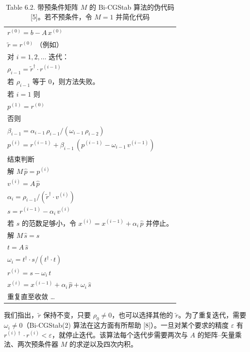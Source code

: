 \begin{table}[htbp]
  \centering
  \caption*{Table 6.2. 带预条件矩阵 $M$ 的 Bi-CGStab 算法的伪代码 [5]。若不预条件，令 $M = 1$ 并简化代码}
  \small
  \begin{tabular}{@{}l@{}}
    $r^{(0)} = b - A\, x^{(0)}$ \\
    $\tilde{r} = r^{(0)}$ \quad （例如） \\
    对 $i = 1, 2, \ldots$ 迭代： \\
    \quad $\rho_{i-1} = \tilde{r}^{\dagger} \cdot r^{(i-1)}$ \\
    \quad 若 $\rho_{i-1}$ 等于 0，则方法失败。 \\
    \quad 若 $i = 1$ 则 \\
    \quad\quad $p^{(1)} = r^{(0)}$ \\
    \quad 否则 \\
    \quad\quad $\beta_{i-1} = \alpha_{i-1}\, \rho_{i-1} / (\omega_{i-1}\,
      \rho_{i-2})$ \\
    \quad\quad $p^{(i)} = r^{(i-1)} + \beta_{i-1}\, (p^{(i-1)} - \omega_{i-1}\,
      v^{(i-1)})$ \\
    \quad 结束判断 \\
    \quad 解 $M\, \hat{p} = p^{(i)}$ \\
    \quad $v^{(i)} = A\, \hat{p}$ \\
    \quad $\alpha_i = \rho_{i-1} / (\tilde{r}^{\dagger} \cdot v^{(i)})$ \\
    \quad $s = r^{(i-1)} - \alpha_i\, v^{(i)}$ \\
    \quad 若 $s$ 的范数足够小，令 $x^{(i)} = x^{(i-1)} +
      \alpha_i\, \hat{p}$ 并停止。 \\
    \quad 解 $M\, \hat{s} = s$ \\
    \quad $t = A\, \hat{s}$ \\
    \quad $\omega_i = t^{\dagger} \cdot s / (t^{\dagger} \cdot t)$ \\
    \quad $r^{(i)} = s - \omega_i\, t$ \\
    \quad $x^{(i)} = x^{(i-1)} + \alpha_i\, \hat{p} + \omega_i\, \hat{s}$ \\
    重复直至收敛 \ldots
  \end{tabular}
\end{table}

我们指出，$\tilde{r}$ 保持不变，只要 $\rho_0 \neq 0$，也可以选择其他的 $\tilde{r}$。为了重复迭代，需要 $\omega_i \neq 0$（Bi-CGStab(2) 算法在这方面有所帮助 [8]）。一旦对某个要求的精度 $\varepsilon$ 有 $r^{(i)\dagger} \cdot r^{(i)} < \varepsilon$，就停止迭代。该算法每个迭代步需要两次与 $A$ 的矩阵–矢量乘法、两次预条件器 $M$ 的求逆以及四次内积。

